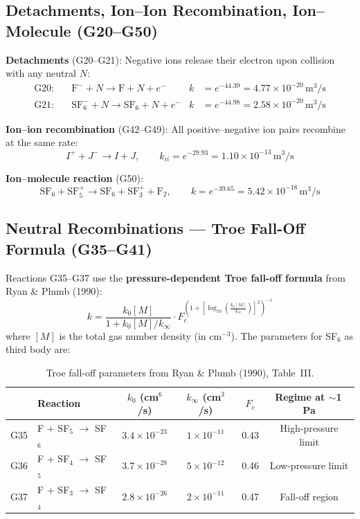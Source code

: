 \documentclass[11pt,a4paper]{article}
\begin{document}
\subsection{Detachments, Ion--Ion Recombination, Ion--Molecule (G20--G50)}

\textbf{Detachments} (G20--G21): Negative ions release their electron upon collision with any neutral $N$:
\begin{align}
  \text{G20:}\quad & \text{F}^- + N \to \text{F} + N + e^-  & k &= e^{-44.39} = 4.77\times10^{-20}\,\text{m}^3/\text{s} \\
  \text{G21:}\quad & \text{SF}_6^- + N \to \text{SF}_6 + N + e^-  & k &= e^{-44.98} = 2.58\times10^{-20}\,\text{m}^3/\text{s}
\end{align}

\textbf{Ion--ion recombination} (G42--G49): All positive--negative ion pairs recombine at the same rate:
\begin{equation}
  I^+ + J^- \to I + J, \qquad k_{ii} = e^{-29.93} = 1.10\times10^{-13}\,\text{m}^3/\text{s}
\end{equation}

\textbf{Ion--molecule reaction} (G50):
\begin{equation}
  \text{SF}_6 + \text{SF}_5^+ \to \text{SF}_6 + \text{SF}_3^+ + \text{F}_2, \qquad k = e^{-39.65} = 5.42\times10^{-18}\,\text{m}^3/\text{s}
\end{equation}

\subsection{Neutral Recombinations --- Troe Fall-Off Formula (G35--G41)}

Reactions G35--G37 use the \textbf{pressure-dependent Troe fall-off formula} from Ryan \& Plumb (1990):
\begin{equation}\label{eq:troe}
  \boxed{k = \frac{k_0 [M]}{1 + k_0 [M] / k_\infty} \cdot F_c^{\left(1 + \left[\log_{10}\!\left(\frac{k_0[M]}{k_\infty}\right)\right]^2\right)^{-1}}}
\end{equation}
where $[M]$ is the total gas number density (in cm$^{-3}$). The parameters for SF$_6$ as third body are:

\begin{table}[h]
\centering
\begin{tabular}{clcccc}
\toprule
 & \textbf{Reaction} & $k_0$ (cm$^6$/s) & $k_\infty$ (cm$^3$/s) & $F_c$ & \textbf{Regime at $\sim$1\,Pa} \\
\midrule
G35 & F + SF$_5$ $\to$ SF$_6$  & $3.4\times10^{-23}$ & $1\times10^{-11}$ & 0.43 & High-pressure limit \\
G36 & F + SF$_4$ $\to$ SF$_5$  & $3.7\times10^{-28}$ & $5\times10^{-12}$ & 0.46 & Low-pressure limit \\
G37 & F + SF$_3$ $\to$ SF$_4$  & $2.8\times10^{-26}$ & $2\times10^{-11}$ & 0.47 & Fall-off region \\
\bottomrule
\end{tabular}
\caption{Troe fall-off parameters from Ryan \& Plumb (1990), Table~III.}
\end{table}
\end{document}

